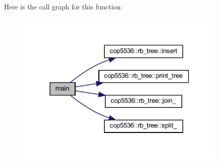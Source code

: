 Here is the call graph for this function\+:
\nopagebreak
\begin{figure}[H]
\begin{center}
\leavevmode
\includegraphics[width=290pt]{rb__main_8cc_a0ddf1224851353fc92bfbff6f499fa97_cgraph}
\end{center}
\end{figure}
